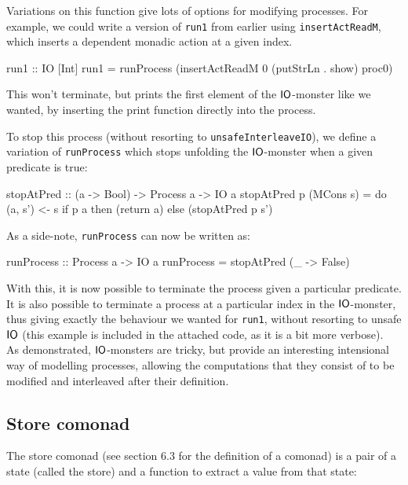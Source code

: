 Variations on this function give lots of options for modifying processes. For example, we could write a version of \verb+run1+ from earlier using \verb+insertActReadM+, which inserts a dependent monadic action at a given index.

\begin{haskell}
run1 :: IO [Int]
run1 = runProcess (insertActReadM 0 (putStrLn . show) proc0)
\end{haskell}

This won't terminate, but prints the first element of the $\mathsf{IO}$-monster like we wanted, by inserting the print function directly into the process.

To stop this process (without resorting to \verb+unsafeInterleaveIO+), we define a variation of \verb+runProcess+ which stops unfolding the $\mathsf{IO}$-monster when a given predicate is true:

\begin{haskell}
stopAtPred :: (a -> Bool) -> Process a -> IO a
stopAtPred p (MCons s) = do (a, s') <- s
                            if p a then (return a) else (stopAtPred p s')
\end{haskell}
 
As a side-note, \verb+runProcess+ can now be written as:
 
 \begin{haskell}
runProcess :: Process a -> IO a
runProcess = stopAtPred (\_ -> False)
\end{haskell}

With this, it is now possible to terminate the process given a particular predicate. It is also possible to terminate a process at a particular index in the $\mathsf{IO}$-monster, thus giving exactly the behaviour we wanted for \verb+run1+, without resorting to unsafe $\mathsf{IO}$ (this example is included in the attached code, as it is a bit more verbose). \\

As demonstrated, $\mathsf{IO}$-monsters are tricky, but provide an interesting intensional way of modelling processes, allowing the computations that they consist of to be modified and interleaved after their definition.
 
\subsection{Store comonad}

The store comonad (see section 6.3 for the definition of a comonad) is a pair of a state (called the store) and a function to extract a value from that state:

